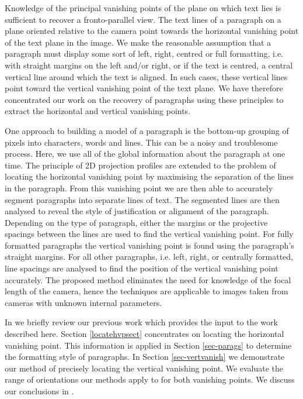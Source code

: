 \documentclass{elsart}   %
\begin{document}
Knowledge of the principal vanishing points of the plane on which text lies is
sufficient to recover a fronto-parallel view. The text lines of a paragraph
on a plane oriented relative to the camera  point towards
the horizontal vanishing point of the text plane in the image. We make the
reasonable assumption that a paragraph must display some sort of
 left,  right, centred or full  formatting, i.e. with straight margins on the
left and/or right, or if the text is centred, a central vertical line around which
the text is aligned.  In such cases, these vertical lines point toward the
vertical vanishing point of the text plane.  We have therefore concentrated our
work on the recovery of paragraphs using these principles to extract the
horizontal and vertical vanishing points. 

One approach to building a model of a paragraph is the bottom-up grouping of
pixels into characters, words and lines. This can be a noisy and troublesome
process. Here, we use all of the global information about the paragraph at one
time.  The principle of 2D projection profiles are extended to the problem of
locating the horizontal vanishing point by maximising the separation of the
lines in the paragraph.  From this vanishing point we are then able to
accurately segment paragraphs into separate lines of text.  The segmented lines
are then analysed to reveal the style of justification or alignment of the
paragraph.  Depending on the type of paragraph, either the margins or the projective
spacings between the lines are used to find the vertical vanishing point. For
fully formatted paragraphs the vertical vanishing point is found
using the paragraph's straight margins. For all other paragraphs,  i.e. left,
right, or centrally formatted,  line spacings are analysed to find
the position of the vertical vanishing point accurately. 
The proposed method eliminates the need for knowledge of 
the focal length of the camera, hence the techniques are applicable to images
taken from cameras with unknown internal parameters.

 
 In 
we briefly review our previous work which provides the input to the work
described here.  Section \ref{locatehvpsect} concentrates on locating the
horizontal vanishing point. This information is applied in Section
\ref{sec-parags} to determine the formatting style of paragraphs.
In Section \ref{sec-vertvanish}  we demonstrate our method of precisely
locating the vertical vanishing point. We evaluate 
the range of orientations our methods apply to for both vanishing points. 
We discuss our conclusions in .




\end{document}

